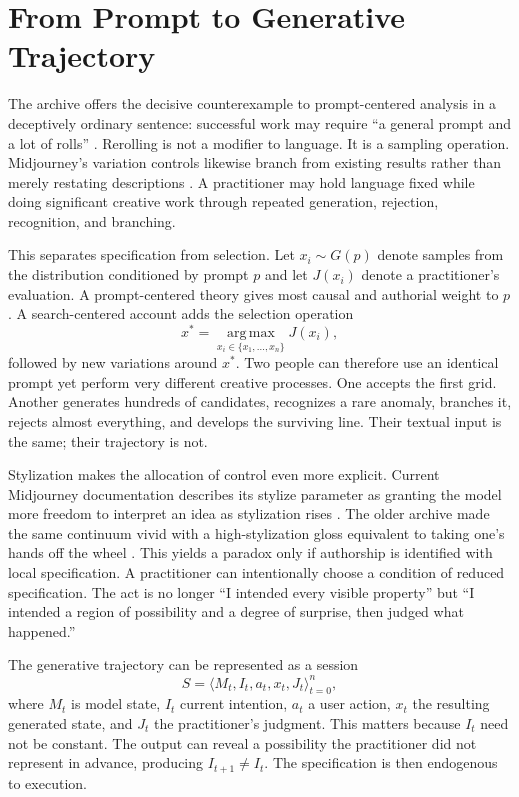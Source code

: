 \documentclass[11pt]{article}
\begin{document}
\section{From Prompt to Generative Trajectory}

The archive offers the decisive counterexample to prompt-centered analysis in a deceptively ordinary sentence: successful work may require ``a general prompt and a lot of rolls'' \parencite{hartsoe2022midjourneyarchive}. Rerolling is not a modifier to language. It is a sampling operation. Midjourney's variation controls likewise branch from existing results rather than merely restating descriptions \parencite{midjourneyVariations}. A practitioner may hold language fixed while doing significant creative work through repeated generation, rejection, recognition, and branching.

This separates specification from selection. Let $x_i \sim G(p)$ denote samples from the distribution conditioned by prompt $p$ and let $J(x_i)$ denote a practitioner's evaluation. A prompt-centered theory gives most causal and authorial weight to $p$. A search-centered account adds the selection operation
\[
x^* = \operatorname*{arg\,max}_{x_i \in \{x_1,\ldots,x_n\}} J(x_i),
\]
followed by new variations around $x^*$. Two people can therefore use an identical prompt yet perform very different creative processes. One accepts the first grid. Another generates hundreds of candidates, recognizes a rare anomaly, branches it, rejects almost everything, and develops the surviving line. Their textual input is the same; their trajectory is not.

Stylization makes the allocation of control even more explicit. Current Midjourney documentation describes its stylize parameter as granting the model more freedom to interpret an idea as stylization rises \parencite{midjourneyStylize}. The older archive made the same continuum vivid with a high-stylization gloss equivalent to taking one's hands off the wheel \parencite{hartsoe2022midjourneyarchive}. This yields a paradox only if authorship is identified with local specification. A practitioner can intentionally choose a condition of reduced specification. The act is no longer ``I intended every visible property'' but ``I intended a region of possibility and a degree of surprise, then judged what happened.''

The generative trajectory can be represented as a session
\[
S = \langle M_t,I_t,a_t,x_t,J_t \rangle_{t=0}^{n},
\]
where $M_t$ is model state, $I_t$ current intention, $a_t$ a user action, $x_t$ the resulting generated state, and $J_t$ the practitioner's judgment. This matters because $I_t$ need not be constant. The output can reveal a possibility the practitioner did not represent in advance, producing $I_{t+1} \neq I_t$. The specification is then endogenous to execution.
\end{document}
